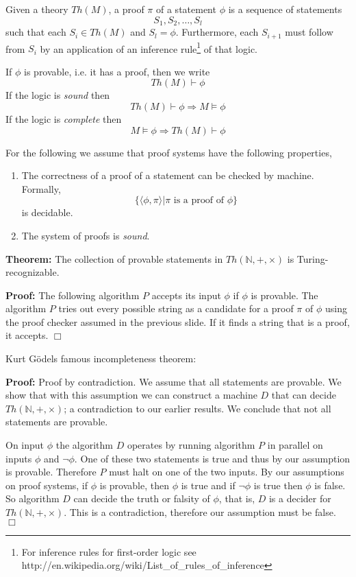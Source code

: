 \documentclass[a4paper,blends,pdf,colorBG,slideColor]{prosper}
\begin{document}
\es

Given a theory $Th(M)$, a proof $\pi$ of a statement $\phi$ is a sequence of statements
\[
S_1,S_2,\ldots,S_l
\]
such that each $S_i \in  Th(M)$ and $S_l = \phi$.  Furthermore, each $S_{i+1}$ must follow from $S_{i}$ by an application of an inference rule\footnote{\tiny For inference rules for first-order logic see http://en.wikipedia.org/wiki/List\_of\_rules\_of\_inference} of that logic.   

If $\phi$ is provable, i.e. it has a proof, then we write
\[
Th(M) \vdash \phi
\]
If the logic is {\em sound} then
\[
Th(M) \vdash \phi \Rightarrow M \models \phi
\]
If the logic is {\em complete} then
\[
M \models \phi \Rightarrow Th(M) \vdash \phi
\]

\es

\es
{}
For the following we assume that proof systems have the following properties,
\begin{enumerate}
\item The correctness of a proof of a statement can be checked by machine.  Formally,
\[
\{\langle\phi,\pi\rangle | \text{$\pi$ is a proof of $\phi$}\}
\]
is decidable.
\item The system of proofs is {\em sound}.  
\end{enumerate}
\es

{\bf Theorem:} The collection of provable statements in $Th({\mathbb N}, +, \times)$ is
Turing-recognizable.

{\bf Proof:} The following algorithm $P$ accepts its input $\phi$ if $\phi$ is provable.
The algorithm $P$ tries out every possible string as a candidate for a proof $\pi$ of $\phi$ using
the proof checker assumed in the previous slide.  If it finds a string that is a proof, it accepts.
$\Box$
\es

Kurt G\"odels famous incompleteness theorem:

\begin{center}
\end{center}

{\bf Proof:} Proof by contradiction. We assume that all statements are provable.  We show
that with this assumption we can construct a machine $D$ that can decide $Th({\mathbb N}, +, \times)$;
a contradiction to our earlier results. We conclude that not all statements are provable.

On input $\phi$ the algorithm $D$ operates by running algorithm $P$ in parallel on inputs
$\phi$ and $\neg \phi$.
One of these two statements is true and thus by our assumption is provable.
Therefore $P$ must halt on one of the two inputs.
By our assumptions on proof systems, if $\phi$ is provable, then $\phi$ is true and if 
$\neg \phi$ is true then $\phi$ is false. So algorithm $D$ can decide the truth or
falsity of $\phi$, that is, $D$ is a decider for $Th({\mathbb N}, +, \times)$.
This is a contradiction, therefore our assumption must be false. $\Box$
\es
\end{document}
